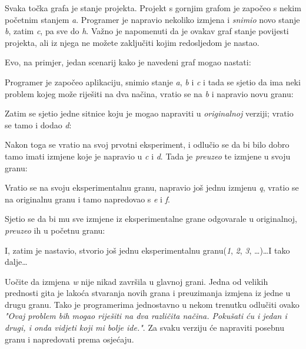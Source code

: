 

Svaka točka grafa je stanje projekta. 
Projekt s gornjim grafom je započeo s nekim početnim stanjem \emph a.
Programer je napravio nekoliko izmjena i \emph{snimio} novo stanje \emph b, zatim \emph c, pa sve do \emph h.
Važno je napomenuti da je ovakav graf stanje povijesti projekta, ali iz njega ne možete zaključiti kojim redosljedom je nastao.

Evo, na primjer, jedan scenarij kako je navedeni graf mogao nastati:



Programer je započeo aplikaciju, snimio stanje \emph a, \emph b i \emph c i tada se sjetio da ima neki problem kojeg može riješiti na dva načina, vratio se na \emph b i napravio novu granu:



Zatim se sjetio jedne sitnice koju je mogao napraviti u \emph{originalnoj} verziji; vratio se tamo i dodao \emph d:



Nakon toga se vratio na svoj prvotni eksperiment, i odlučio se da bi bilo dobro tamo imati izmjene koje je napravio u \emph c i \emph d.
Tada je \emph{preuzeo} te izmjene u svoju granu:



Vratio se na svoju eksperimentalnu granu, napravio još jednu izmjenu \emph q, vratio se na originalnu granu i tamo napredovao s \emph e i \emph f. 



Sjetio se da bi mu sve izmjene iz eksperimentalne grane odgovarale u originalnoj, \emph{preuzeo} ih u početnu granu:



I, zatim je nastavio, stvorio još jednu eksperimentalnu granu(\emph 1, \emph 2, \emph 3, \dots)\dots I tako dalje\dots



Uočite da izmjena \emph w nije nikad završila u glavnoj grani. 
Jedna od velikih prednosti gita je lakoća stvaranja novih grana i preuzimanja izmjena iz jedne u drugu granu. 
Tako je programerima jednostavno u nekom trenutku odlučiti ovako \emph{"Ovaj problem bih mogao riješiti na dva različita načina. Pokušati ću i jedan i drugi, i onda vidjeti koji mi bolje ide."}. Za svaku verziju će napraviti posebnu granu i napredovati prema osjećaju.

